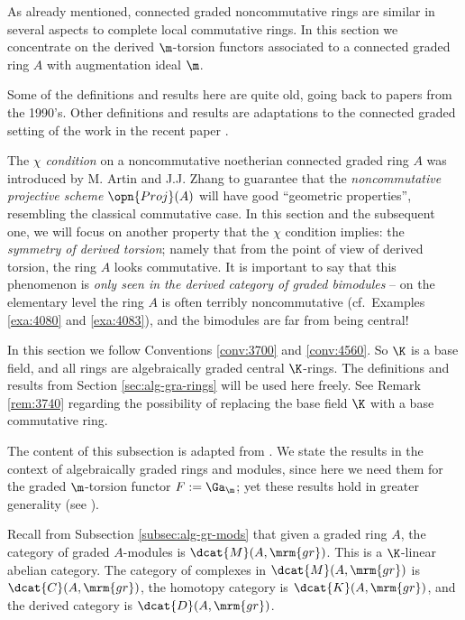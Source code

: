 \cleardoublepage
{}
\label{sec:der-tors-conn}

\AYcopyright

As already mentioned, connected graded noncommutative rings are similar 
in several aspects to complete local commutative rings. 
In this section we concentrate on the derived $\m$-torsion functors 
associated to a connected graded ring $A$ with augmentation ideal $\m$. 

Some of the definitions and results here are quite old, going back to papers 
from the 1990's. Other definitions and results are adaptations to the 
connected graded setting of the work in the recent paper \cite{VyYe}. 

The {\em $\chi$ condition} on a noncommutative noetherian connected graded ring 
$A$ was introduced by M. Artin and J.J. Zhang \cite{ArZh} to guarantee that 
the {\em noncommutative projective scheme} $\opn{Proj}(A)$ will have good 
``geometric properties'', resembling the classical commutative case. In this 
section and the subsequent one, we will focus on another property that the 
$\chi$ condition implies: the {\em symmetry of derived torsion}; namely that 
from the point of view of derived torsion, the ring $A$ looks commutative. 
It is important to say that this phenomenon is {\em only seen in the derived 
category of graded bimodules} -- on the elementary level the ring $A$ is often 
terribly noncommutative (cf.\ Examples \ref{exa:4080} and \ref{exa:4083}), 
and the bimodules are far from being central!

In this section we follow Conventions \ref{conv:3700} and \ref{conv:4560}.
So $\K$ is a base field, and all rings are algebraically graded central 
$\K$-rings. The definitions and results from Section \ref{sec:alg-gra-rings} 
will be used here freely. See Remark \ref{rem:3740} regarding the possibility of 
replacing the base field $\K$ with a base commutative ring. 



\label{subsec:QC-FD-funs}

The content of this subsection is adapted from \cite[Section 1]{VyYe}. 
We state the results in the context of algebraically graded rings and modules, 
since here we need them for the graded $\m$-torsion functor 
$F := \Ga_{\m}$; yet these results hold in greater generality (see 
\cite{VyYe}). 

Recall from Subsection \ref{subsec:alg-gr-mods} that given a graded ring $A$, 
the category of graded $A$-modules is $\dcat{M}(A, \mrm{gr})$. 
This is a $\K$-linear abelian category. The category of complexes in 
$\dcat{M}(A, \mrm{gr})$ is $\dcat{C}(A, \mrm{gr})$, 
the homotopy category is $\dcat{K}(A, \mrm{gr})$, and the derived category is 
$\dcat{D}(A, \mrm{gr})$. 

